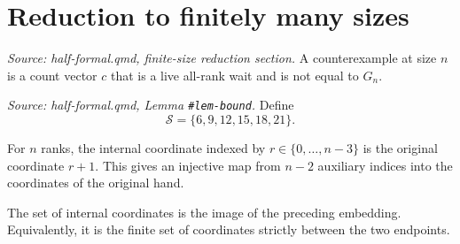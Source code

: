 \chapter{Reduction to finitely many sizes}

\begin{definition}
  \label{def:counterexample_at}
  \textit{Source: half-formal.qmd, finite-size reduction section.}
  A counterexample at size \(n\) is a count vector \(c\) that is a live
  all-rank wait and is not equal to \(G_n\).
\end{definition}

\begin{definition}
  \label{def:small_sizes}
  \textit{Source: half-formal.qmd, Lemma \texttt{\#lem-bound}.}
  Define
  \[
    \mathcal S=\{6,9,12,15,18,21\}.
  \]
\end{definition}

\begin{definition}

  \label{def:internal_embedding}
  For \(n\) ranks, the internal coordinate indexed by \(r\in\{0,\ldots,n-3\}\)
  is the original coordinate \(r+1\).  This gives an injective map from
  \(n-2\) auxiliary indices into the coordinates of the original hand.
\end{definition}

\begin{definition}

  \label{def:internal_indices}
  The set of internal coordinates is the image of the preceding embedding.
  Equivalently, it is the finite set of coordinates strictly between the two
  endpoints.
\end{definition}

